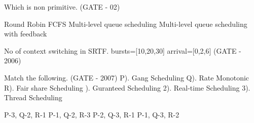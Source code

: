 

\begin{questyle}

  \question Which is non primitive. (GATE - 02)

  \begin{choices}
    \choice Round Robin
    \choice FCFS
    \choice Multi-level queue scheduling
    \choice Multi-level queue scheduling with feedback
  \end{choices}

  \end{questyle}





\begin{questyle}

  \question No of context switching in SRTF. bursts=[10,20,30] arrival=[0,2,6] (GATE - 2006)

  \begin{oneparchoices}
  \end{oneparchoices}

  \end{questyle}





\begin{questyle}

  \question Match the following. (GATE - 2007) \newline
   P). Gang Scheduling  Q). Rate Monotonic  R). Fair share Scheduling ). Guranteed Scheduling 2). Real-time Scheduling 3). Thread Scheduling
  \begin{choices}
    \choice P-3, Q-2, R-1
    \choice P-1, Q-2, R-3
    \choice P-2, Q-3, R-1
    \choice P-1, Q-3, R-2
  \end{choices}


  \end{questyle}




